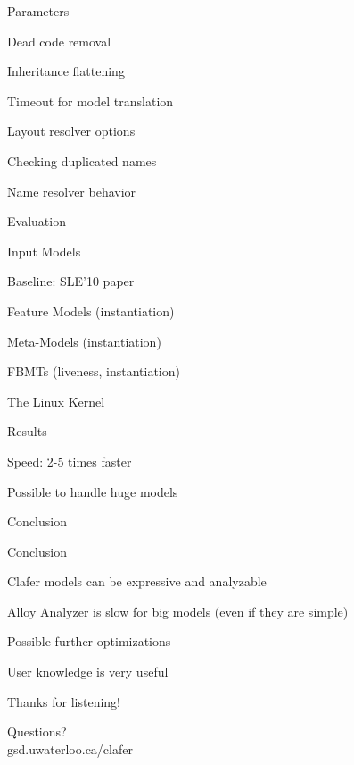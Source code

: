 \documentclass[table,15pt,t]{beamer}
\newcommand{\vmiddle}[1]{
  \vspace{\stretch{1}}
  #1
  \vspace{\stretch{1}}
}
\newcommand{\interframe}[1]{
\begin{frame}{}
\vmiddle{\hmiddle{\Huge #1}}
\end{frame}
}
\newcommand{\mlist}[1]{
\vmiddle{
  \begin{list}{}{}
    #1
  \end{list}
  }
}
\newcommand{\hmiddle}[1]{
  \begin{center}#1\end{center}
}
\newcounter{i}
\begin{document}
\begin{frame}{Parameters}
 \mlist{
    \item Dead code removal
    \item Inheritance flattening
    \item Timeout for model translation
    \item Layout resolver options
    \item Checking duplicated names
    \item Name resolver behavior
 }
\end{frame}

\interframe{Evaluation}

\begin{frame}{Input Models}
 \mlist{
    \item Baseline: SLE'10 paper\pause
    \item Feature Models (instantiation)
    \item Meta-Models (instantiation)
    \item FBMTs (liveness, instantiation)\pause
    \item The Linux Kernel
 }
\end{frame}

\begin{frame}{Results}
 \mlist{
    \item Speed: 2-5 times faster
    \item Possible to handle huge models
 }
\end{frame}

\interframe{Conclusion}

\begin{frame}{Conclusion}
 \mlist{
    \item Clafer models can be expressive and analyzable
    \item Alloy Analyzer is slow for big models (even if they are simple)
    \item Possible further optimizations
    \item User knowledge is very useful
 }
\end{frame}

\interframe{Thanks for listening!}

\interframe{Questions?\\[1cm]\normalsize{\textsf{gsd.uwaterloo.ca/clafer}}}
\end{document}
